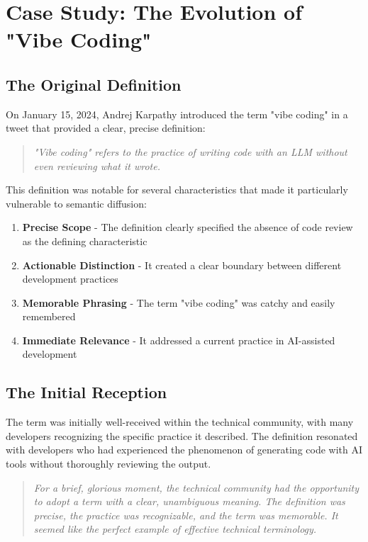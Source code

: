 \documentclass[11pt]{article}
\begin{document}
\section{Case Study: The Evolution of "Vibe Coding"}

\subsection{The Original Definition}

On January 15, 2024, Andrej Karpathy introduced the term "vibe coding" in a tweet that provided a clear, precise definition:

\begin{quote}
\emph{"Vibe coding" refers to the practice of writing code with an LLM without even reviewing what it wrote.}
\end{quote}

This definition was notable for several characteristics that made it particularly vulnerable to semantic diffusion:

\begin{enumerate}
\item \textbf{Precise Scope} - The definition clearly specified the absence of code review as the defining characteristic
\item \textbf{Actionable Distinction} - It created a clear boundary between different development practices
\item \textbf{Memorable Phrasing} - The term "vibe coding" was catchy and easily remembered
\item \textbf{Immediate Relevance} - It addressed a current practice in AI-assisted development
\end{enumerate}

\subsection{The Initial Reception}

The term was initially well-received within the technical community, with many developers recognizing the specific practice it described. The definition resonated with developers who had experienced the phenomenon of generating code with AI tools without thoroughly reviewing the output.

\begin{quote}
\emph{For a brief, glorious moment, the technical community had the opportunity to adopt a term with a clear, unambiguous meaning. The definition was precise, the practice was recognizable, and the term was memorable. It seemed like the perfect example of effective technical terminology.}
\end{quote}
\end{document}
